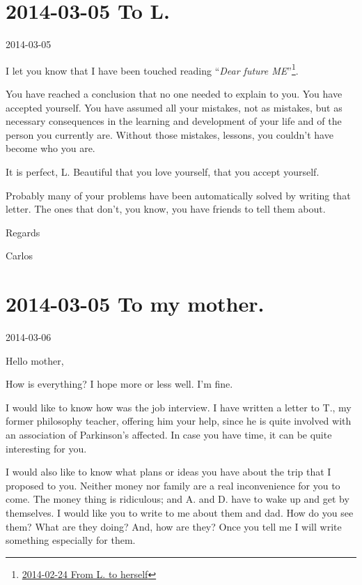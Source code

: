 \documentclass[]{book}
\let\rmarkdownfootnote\footnote%
\def\footnote{\protect\rmarkdownfootnote}
\begin{document}
\hypertarget{toT20140305}{%
\section*{2014-03-05 To L.}\label{toT20140305}}

2014-03-05

I let you know that I have been touched reading ``\emph{Dear future ME}''\footnote{\protect\hyperlink{fromL20140224}{2014-02-24 From L. to herself}}.

You have reached a conclusion that no one needed to explain to you. You have accepted yourself. You have assumed all your mistakes, not as mistakes, but as necessary consequences in the learning and development of your life and of the person you currently are. Without those mistakes, lessons, you couldn't have become who you are.

It is perfect, L. Beautiful that you love yourself, that you accept yourself.

Probably many of your problems have been automatically solved by writing that letter. The ones that don't, you know, you have friends to tell them about.

Regards

Carlos

\hypertarget{tomother20140306}{%
\section*{2014-03-05 To my mother.}\label{tomother20140306}}

2014-03-06

Hello mother,

How is everything? I hope more or less well. I'm fine.

I would like to know how was the job interview. I have written a letter to T., my former philosophy teacher, offering him your help, since he is quite involved with an association of Parkinson's affected. In case you have time, it can be quite interesting for you.

I would also like to know what plans or ideas you have about the trip that I proposed to you. Neither money nor family are a real inconvenience for you to come. The money thing is ridiculous; and A. and D. have to wake up and get by themselves. I would like you to write to me about them and dad. How do you see them? What are they doing? And, how are they? Once you tell me I will write something especially for them.
\end{document}
